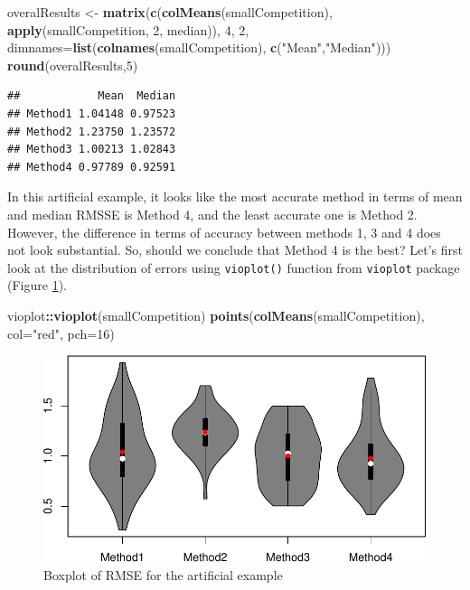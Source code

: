 \documentclass[]{book}
\newenvironment{Shaded}{\begin{snugshade}}{\end{snugshade}}
\newcommand{\DataTypeTok}[1]{\textcolor[rgb]{0.13,0.29,0.53}{#1}}
\newcommand{\DecValTok}[1]{\textcolor[rgb]{0.00,0.00,0.81}{#1}}
\newcommand{\KeywordTok}[1]{\textcolor[rgb]{0.13,0.29,0.53}{\textbf{#1}}}
\newcommand{\NormalTok}[1]{#1}
\newcommand{\OperatorTok}[1]{\textcolor[rgb]{0.81,0.36,0.00}{\textbf{#1}}}
\newcommand{\StringTok}[1]{\textcolor[rgb]{0.31,0.60,0.02}{#1}}
\theoremstyle{definition}
\theoremstyle{definition}
\theoremstyle{definition}
\theoremstyle{definition}
\theoremstyle{remark}
\begin{document}
\begin{Shaded}
\begin{Highlighting}[]
\NormalTok{overalResults <-}
\StringTok{  }\KeywordTok{matrix}\NormalTok{(}\KeywordTok{c}\NormalTok{(}\KeywordTok{colMeans}\NormalTok{(smallCompetition), }
           \KeywordTok{apply}\NormalTok{(smallCompetition, }\DecValTok{2}\NormalTok{, median)),}
         \DecValTok{4}\NormalTok{, }\DecValTok{2}\NormalTok{, }\DataTypeTok{dimnames=}\KeywordTok{list}\NormalTok{(}\KeywordTok{colnames}\NormalTok{(smallCompetition),}
                             \KeywordTok{c}\NormalTok{(}\StringTok{"Mean"}\NormalTok{,}\StringTok{"Median"}\NormalTok{)))}
\KeywordTok{round}\NormalTok{(overalResults,}\DecValTok{5}\NormalTok{)}
\end{Highlighting}
\end{Shaded}

\begin{verbatim}
##            Mean  Median
## Method1 1.04148 0.97523
## Method2 1.23750 1.23572
## Method3 1.00213 1.02843
## Method4 0.97789 0.92591
\end{verbatim}

In this artificial example, it looks like the most accurate method in terms of mean and median RMSSE is Method 4, and the least accurate one is Method 2. However, the difference in terms of accuracy between methods 1, 3 and 4 does not look substantial. So, should we conclude that Method 4 is the best? Let's first look at the distribution of errors using \texttt{vioplot()} function from \texttt{vioplot} package (Figure \ref{fig:smallCompetitionBoxplot}).

\begin{Shaded}
\begin{Highlighting}[]
\NormalTok{vioplot}\OperatorTok{::}\KeywordTok{vioplot}\NormalTok{(smallCompetition)}
\KeywordTok{points}\NormalTok{(}\KeywordTok{colMeans}\NormalTok{(smallCompetition), }\DataTypeTok{col=}\StringTok{"red"}\NormalTok{, }\DataTypeTok{pch=}\DecValTok{16}\NormalTok{)}
\end{Highlighting}
\end{Shaded}

\begin{figure}
\centering
\includegraphics{Svetunkov--2022----ADAM_files/figure-latex/smallCompetitionBoxplot-1.pdf}
\caption{\label{fig:smallCompetitionBoxplot}Boxplot of RMSE for the artificial example}
\end{figure}
\end{document}

